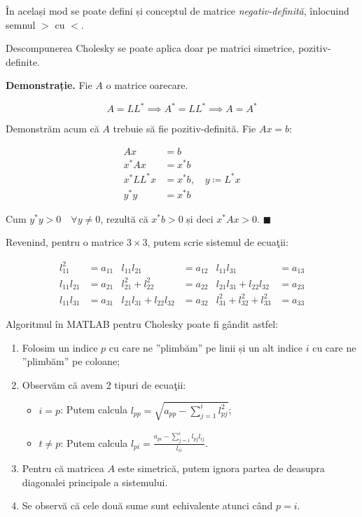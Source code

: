 \documentclass{exam}
\begin{document}
\par În același mod se poate defini și conceptul de matrice
\textit{negativ-definită}, înlocuind semnul $>$ cu $<$.

\par Descompunerea Cholesky se poate aplica doar pe matrici simetrice,
pozitiv-definite.

\textbf{Demonstrație.} Fie $A$ o matrice oarecare.

\begin{equation*}
	A = LL^* \implies A^* = LL^* \implies A = A^*
\end{equation*}

\par Demonstrăm acum că $A$ trebuie să fie pozitiv-definită. Fie $Ax = b$:

\begin{align*}
	Ax          & = b                             \\
	x^* A x     & = x^* b                         \\
	x^* L L^* x & = x^* b, \quad y \coloneq L^* x \\
	y^* y       & = x^* b
\end{align*}

\par Cum $y^* y > 0 \quad \forall y \neq 0$, rezultă că $x^* b > 0$ și deci
$x^* A x > 0$. $\blacksquare$

\newpage
\par Revenind, pentru o matrice $3 \times 3$, putem scrie sistemul de ecuaţii:

\begin{align*}
	l_{11}^2     & = a_{11} & l_{11}l_{21}                & = a_{12} & l_{11}l_{31}                   & = a_{13} \\
	l_{11}l_{21} & = a_{21} & l_{21}^2 + l_{22}^2         & = a_{22} & l_{21}l_{31} + l_{22}l_{32}    & = a_{23} \\
	l_{11}l_{31} & = a_{31} & l_{21}l_{31} + l_{22}l_{32} & = a_{32} & l_{31}^2 + l_{32}^2 + l_{33}^2 & = a_{33}
\end{align*}

\par Algoritmul în MATLAB pentru Cholesky poate fi gândit astfel:

\begin{enumerate}
	\item Folosim un indice $p$ cu care ne ”plimbăm” pe linii și un alt indice $i$ cu care ne ”plimbăm” pe coloane;
	\item Observăm că avem 2 tipuri de ecuaţii:
	      \begin{itemize}
		      \item $i = p$: Putem calcula $l_{pp} = \sqrt{a_{pp} - \sum_{j = 1}^{i}{l_{pj}^2}}$;
		      \item $t \neq p$: Putem calcula $l_{pi} = \frac{a_{pi} - \sum_{j = 1}^{i}{l_{pj} l_{ij}}}{l_{ii}}$.
	      \end{itemize}
	\item Pentru că matricea $A$ este simetrică, putem ignora partea de deasupra
	      diagonalei principale a sistemului.
	\item Se observă că cele două sume sunt echivalente atunci când $p = i$.
\end{enumerate}
\end{document}
